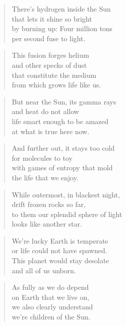 \documentclass[10pt,a4paper]{article}
\begin{document}
\begin{multicols}{2}
\begin{verse}
There’s hydrogen inside the Sun\\
that lets it shine so bright\\
by burning up: Four million tons\\
per second fuse to light.
\end{verse}

\begin{verse}
This fusion forges helium\\
and other specks of dust\\
that constitute the medium\\
from which grows life like us.
\end{verse}

\begin{verse}
But near the Sun, its gamma rays\\
and heat do not allow\\
life smart enough to be amazed\\
at what is true here now.
\end{verse}

\begin{verse}
And further out, it stays too cold\\
for molecules to toy\\
with games of entropy that mold\\
the life that we enjoy.
\end{verse}

\begin{verse}
While outermost, in blackest night,\\
drift frozen rocks so far,\\
to them our splendid sphere of light\\
looks like another star.
\end{verse}

\begin{verse}
We’re lucky Earth is temperate\\
or life could not have spawned.\\
This planet would stay desolate\\
and all of us unborn.
\end{verse}

\begin{verse}
As fully as we do depend\\
on Earth that we live on,\\
we also clearly understand\\
we’re children of the Sun.
\end{verse}


\end{multicols}
\end{document}
